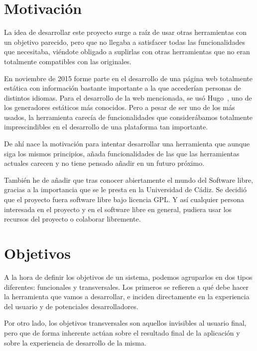 \section{Motivación}

La idea de desarrollar este proyecto surge a raíz de usar otras herramientas con un objetivo
parecido, pero que no llegaba a satisfacer todas las funcionalidades que necesitaba, viéndote obligado
a suplirlas con otras herramientas que no eran totalmente compatibles con las originales.

En noviembre de 2015 forme parte en el desarrollo de una página web totalmente estática con información
bastante importante a la que accederían personas de distintos idiomas. Para el desarrollo de la web mencionada,
se usó Hugo~\cite{hugo}, uno de los generadores estáticos más conocidos. Pero a pesar de ser uno de los más usados,
la herramienta carecía de funcionalidades que considerábamos totalmente imprescindibles en el desarrollo
de una plataforma tan importante.

De ahí nace la motivación para intentar desarrollar una herramienta que aunque siga los mismos principios,
añada funcionalidades de las que las herramientas actuales carecen y no tiene pensado añadir en un futuro
próximo.

También he de añadir que tras conocer abiertamente el mundo del Software libre, gracias a la importancia
que se le presta en la Universidad de Cádiz. Se decidió que el proyecto fuera software libre bajo
licencia GPL. Y así cualquier persona interesada en el proyecto y en el software libre
en general, pudiera usar los recursos del proyecto o colaborar libremente.

\section{Objetivos}

A la hora de definir los objetivos de un sistema, podemos agruparlos en dos tipos
diferentes: funcionales y transversales. Los primeros se refieren a qué debe hacer
la herramienta que vamos a desarrollar, e inciden directamente en la experiencia del
usuario y de potenciales desarrolladores.

Por otro lado, los objetivos transversales son aquellos invisibles al usuario final,
pero que de forma inherente actúan sobre el resultado final de la aplicación y
sobre la experiencia de desarrollo de la misma.

